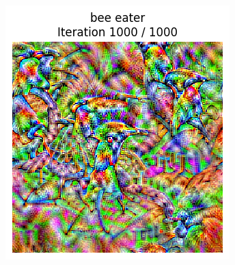 \begin{figure}[H]
\begin{subfigure}[t]{.25\textwidth}
        \caption{}
        \label{fig:class_viz_iter_vgg:sub2}
    \end{subfigure}%
    \begin{subfigure}[t]{.25\textwidth}
        \centering
        \includegraphics[width=\linewidth]{VGG/VGG_bird_animated_1000_regpp_blur_last_frame.png}
        \caption{}
        \label{fig:class_viz_iter_vgg:sub3}
    \end{subfigure}%
    \begin{subfigure}[t]{.25\textwidth}
        \centering

\end{subfigure}
\end{figure}
